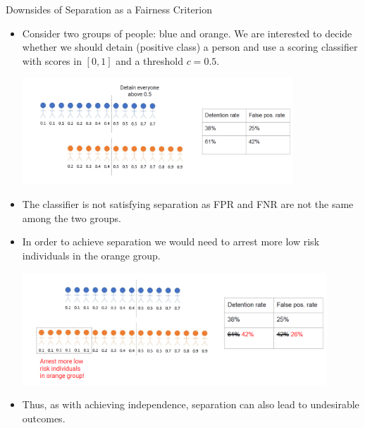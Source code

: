 \begin{vbframe}{Downsides of Separation as a Fairness Criterion}
	\small{
		\begin{itemize}
			\item Consider two groups of people: blue and orange. We are interested to decide whether we should detain (positive class) a person and use a scoring classifier with scores in $[0,1]$ and a threshold $c=0.5.$
			
			\begin{center}
					\includegraphics[width=0.8\textwidth]{figure/separation_issue_1.png}
			\end{center}  
			\item The classifier is not satisfying separation as FPR and FNR are not the same among the two groups.
			\framebreak
%			
			\item In order to achieve separation we would need to arrest more low risk individuals in the orange group.
			\begin{center}
				\includegraphics[width=0.9\textwidth]{figure/separation_issue_2.png}
			\end{center}
			\item Thus, as with achieving independence, separation can also lead to undesirable outcomes.
%			
		\end{itemize}
	}
\end{vbframe}


